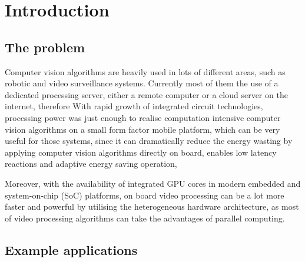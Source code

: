 \chapter{Introduction} \label{Chapter:Introduction}

\iffalse
1-1.5 pages
\fi

\section{The problem}

\iffalse
\fi

Computer vision algorithms are heavily used in lots of different areas, such as robotic and video surveillance systems. Currently most of them  the use of a dedicated processing server, either a remote computer or a cloud server on the internet, therefore  With rapid growth of integrated circuit technologies, processing power was just enough to realise computation intensive computer vision algorithms on a small form factor mobile platform, which can be very useful for those systems, since it can dramatically reduce the energy wasting by applying computer vision algorithms directly on board, enables low latency reactions and adaptive energy saving operation, 

Moreover, with the availability of integrated GPU cores in modern embedded and system-on-chip (SoC) platforms, on board video processing can be a lot more faster and powerful by utilising the heterogeneous hardware architecture, as most of video processing algorithms can take the advantages of parallel computing.


\section{Example applications} %

